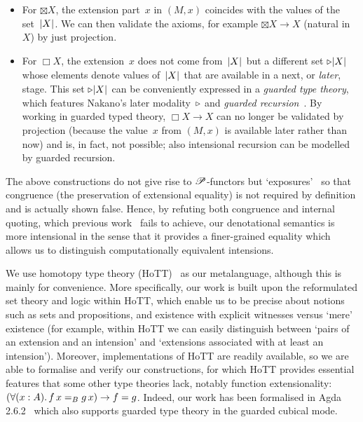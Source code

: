 \documentclass[a4paper,UKenglish,numberwithinsect,cleveref,thm-restate]{lipics-v2021}
\numberwithin{equation}{section}
\theoremstyle{definition}
\theoremstyle{plain}
\begin{document}
\begin{itemize}
    \item For $\boxtimes X$, the extension part~$x$ in $(M, x)$ coincides with the values of the set~$\mathopen{}\left|X\right|_{}^{}\mathclose{}$.
    We can then validate the \SFour axioms, for example $\boxtimes X \to X$ (natural in~$X$) by just projection.
    
    \item For $\Box X$, the extension~$x$ does not come from~$\mathopen{}\left|X\right|_{}^{}\mathclose{}$ but a different set $\mathord{\triangleright} \mathopen{}\left|X\right|_{}^{}\mathclose{}$ whose elements denote values of~$\mathopen{}\left|X\right|_{}^{}\mathclose{}$ that are available in a next, or \emph{later}, stage.
    This set $\mathord{\triangleright} \mathopen{}\left|X\right|_{}^{}\mathclose{}$ can be conveniently expressed in a \emph{guarded type theory}, which features Nakano's later modality~$\mathord{\triangleright}$ and \emph{guarded recursion}~\cite{Nakano2000}.
    By working in guarded typed theory, $\Box X \to X$ can no longer be validated by projection (because the value~$x$ from $(M, x)$ is available later rather than now) and is, in fact, not possible; also intensional recursion can be modelled by guarded recursion.
\end{itemize}
The above constructions do not give rise to $\mathscr{P}$-functors but `exposures'~\cite{Kavvos2017b} so that congruence (the preservation of extensional equality) is not required by definition and is actually shown false.
Hence, by refuting both congruence and internal quoting, which previous work~\cite{Gabbay2013,Kavvos2017b} fails to achieve, our denotational semantics is more intensional in the sense that it provides a finer-grained equality which allows us to distinguish computationally equivalent intensions.%

We use homotopy type theory (HoTT)~\cite{hottbook} as our metalanguage, although this is mainly for convenience.
More specifically, our work is built upon the reformulated set theory and logic within HoTT, which enable us to be precise about notions such as sets and propositions, and existence with explicit witnesses versus `mere' existence (for example, within HoTT we can easily distinguish between `pairs of an extension and an intension' and `extensions associated with at least an intension').
Moreover, implementations of HoTT are readily available, so we are able to formalise and verify our constructions, for which HoTT provides essential features that some other type theories lack, notably function extensionality: $\left(\fall{x : A} f\,x =_B g\,x\right) \to f = g$.
Indeed, our work has been formalised in Agda 2.6.2~\cite{Agda} which also supports guarded type theory in the guarded cubical mode.
\end{document}
